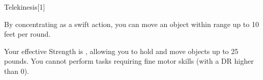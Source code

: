 \begin{spellsection}{Telekinesis}[1]
    \begin{spellheader}
    \end{spellheader}
    \begin{spellcontent}
        \begin{spelltargetinginfo}
            \spellrng{\rngclose}
        \end{spelltargetinginfo}
        \begin{spelleffects}
            \spelleffect By concentrating as a swift action, you can move an object within range up to 10 feet per round.

            Your effective Strength is , allowing you to hold and move objects up to 25 pounds. You cannot perform tasks requiring fine motor skills (with a DR higher than 0).
            \spelldur \durshort
        \end{spelleffects}
    \end{spellcontent}
    \begin{spellfooter}
        \miscastexplode
    \end{spellfooter}
    \begin{spellaugments}
    \end{spellaugments}
\end{spellsection}

